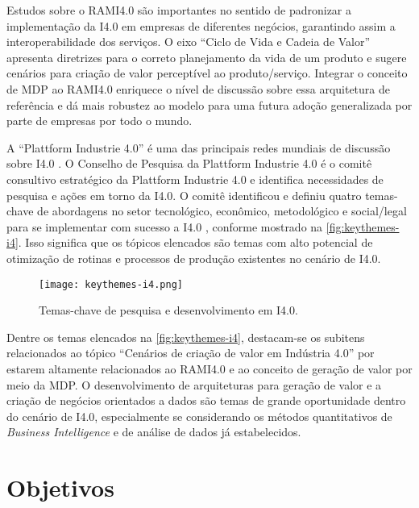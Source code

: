 Estudos sobre o RAMI4.0 são importantes no sentido de padronizar a implementação da I4.0 em empresas de diferentes negócios, garantindo assim a interoperabilidade dos serviços. O eixo ``Ciclo de Vida e Cadeia de Valor'' apresenta diretrizes para o correto planejamento da vida de um produto e sugere cenários para criação de valor perceptível ao produto/serviço. Integrar o conceito de MDP ao RAMI4.0 enriquece o nível de discussão sobre essa arquitetura de referência e dá mais robustez ao modelo para uma futura adoção generalizada por parte de empresas por todo o mundo.

A ``Plattform Industrie 4.0'' é uma das principais redes mundiais de discussão sobre I4.0 \cite{kagermann2013recommendations, acatech2014plattform, germany2019plattform}. O Conselho de Pesquisa da Plattform Industrie 4.0 é o comitê consultivo estratégico da Plattform Industrie 4.0 e identifica necessidades de pesquisa e ações em torno da I4.0. O comitê identificou e definiu quatro temas-chave de abordagens no setor tecnológico, econômico, metodológico e social/legal para se implementar com sucesso a I4.0 \cite{hirsch-kreinsen2019keythemes}, conforme mostrado na \autoref{fig:keythemes-i4}. Isso significa que os tópicos elencados são temas com alto potencial de otimização de rotinas e processos de produção existentes no cenário de I4.0.

\begin{figure}[htb]
  \centering
  \texttt{[image: keythemes-i4.png]}
  \caption{Temas-chave de pesquisa e desenvolvimento em I4.0.}
  \label{fig:keythemes-i4}
\end{figure}

Dentre os temas elencados na \autoref{fig:keythemes-i4}, destacam-se os subitens relacionados ao tópico ``Cenários de criação de valor em Indústria 4.0'' por estarem altamente relacionados ao RAMI4.0 e ao conceito de geração de valor por meio da MDP. O desenvolvimento de arquiteturas para geração de valor e a criação de negócios orientados a dados são temas de grande oportunidade dentro do cenário de I4.0, especialmente se considerando os métodos quantitativos de \textit{Business Intelligence} e de análise de dados já estabelecidos.

\section{Objetivos}
\label{sec:objetivos}

